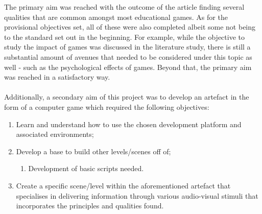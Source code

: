 \noindent The primary aim was reached with the outcome of the article finding several qualities that are common amongst most educational games. As for the provisional objectives set, all of these were also completed albeit some not being to the standard set out in the beginning. For example, while the objective to study the impact of games was discussed in the literature study, there is still a substantial amount of avenues that needed to be considered under this topic as well - such as the psychological effects of games. Beyond that, the primary aim was reached in a satisfactory way.
\\\\
\noindent Additionally, a secondary aim of this project was to develop an artefact in the form of a computer game which required the following objectives:
\begin{enumerate}
\item Learn and understand how to use the chosen development platform and associated environments;
\item Develop a base to build other levels/scenes off of;
\begin{enumerate}
\item Development of basic scripts needed.
\end{enumerate}
\item Create a specific scene/level within the aforementioned artefact that specialises in delivering information through various audio-visual stimuli that incorporates the principles and qualities found.
\end{enumerate}


